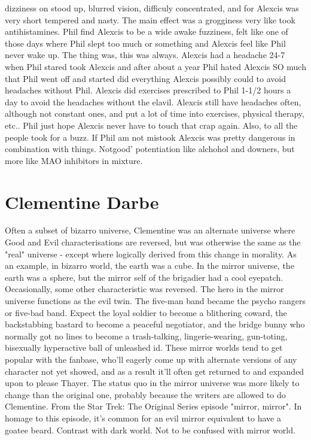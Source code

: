 \documentclass[12pt]{book}
\begin{document}
dizziness on stood up, blurred vision, difficuly concentrated, and for Alexcis was very short tempered and nasty. The main effect was a grogginess very like took antihistamines. Phil find Alexcis to be a wide awake fuzziness, felt like one of those days where Phil slept too much or something and Alexcis feel like Phil never wake up. The thing was, this was always. Alexcis had a headache 24-7 when Phil stared took Alexcis and after about a year Phil hated Alexcis SO much that Phil went off and started did everything Alexcis possibly could to avoid headaches without Phil. Alexcis did exercises prescribed to Phil 1-1/2 hours a day to avoid the headaches without the elavil. Alexcis still have headaches often, although not constant ones, and put a lot of time into exercises, physical therapy, etc.. Phil just hope Alexcis never have to touch that crap again. Also, to all the people took for a buzz. If Phil am not mistook Alexcis was pretty dangerous in combination with things. Notgood' potentiation like alchohol and downers, but more like MAO inhibitors in mixture.



\chapter{Clementine Darbe}

Often a subset of bizarro universe, Clementine was an alternate universe where Good and Evil characterisations are reversed, but was otherwise the same as the "real" universe - except where logically derived from this change in morality. As an example, in bizarro world, the earth was a cube. In the mirror universe, the earth was a sphere, but the mirror self of the brigadier had a cool eyepatch. Occasionally, some other characteristic was reversed. The hero in the mirror universe functions as the evil twin. The five-man band became the psycho rangers or five-bad band. Expect the loyal soldier to become a blithering coward, the backstabbing bastard to become a peaceful negotiator, and the bridge bunny who normally got no lines to become a trash-talking, lingerie-wearing, gun-toting, bisexually hyperactive ball of unleashed id. These mirror worlds tend to get popular with the fanbase, who'll eagerly come up with alternate versions of any character not yet showed, and as a result it'll often get returned to and expanded upon to please Thayer. The status quo in the mirror universe was more likely to change than the original one, probably because the writers are allowed to do Clementine. From the Star Trek: The Original Series episode "mirror, mirror". In homage to this episode, it's common for an evil mirror equivalent to have a goatee beard. Contrast with dark world. Not to be confused with mirror world.
\end{document}
